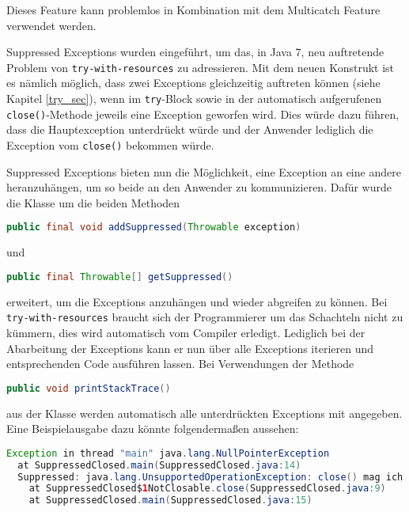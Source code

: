 \documentclass[times, 10pt,twocolumn]{article}
\begin{document}
Dieses Feature kann problemlos in Kombination mit dem Multicatch Feature verwendet werden.

\label{supp_exception_subsec}
Suppressed Exceptions wurden eingeführt, um das, in Java 7, neu auftretende Problem von \texttt{try-with-resources} zu adressieren.
Mit dem neuen Konstrukt ist es nämlich möglich, dass zwei Exceptions gleichzeitig auftreten können (siehe Kapitel \ref{try_sec}), wenn im
\texttt{try}-Block sowie in der automatisch aufgerufenen \texttt{close()}-Methode jeweils eine Exception geworfen wird. Dies würde
dazu führen, dass die Hauptexception unterdrückt würde und der Anwender lediglich die Exception vom \texttt{close()} bekommen würde.

Suppressed Exceptions bieten nun die Möglichkeit, eine Exception an eine andere heranzuhängen, um so beide an den Anwender zu
kommunizieren. Dafür wurde die Klasse  um die beiden Methoden 
\begin{lstlisting}[language=java,breaklines=true]
public final void addSuppressed(Throwable exception)
\end{lstlisting}
und 
\begin{lstlisting}[language=java,breaklines=true]
public final Throwable[] getSuppressed()
\end{lstlisting}
erweitert, um die Exceptions anzuhängen und wieder abgreifen zu können. 
Bei \texttt{try-with-resources} braucht sich der Programmierer um das Schachteln nicht zu kümmern, dies wird 
automatisch vom Compiler erledigt.\cite{sbJ7coin} Lediglich bei der Abarbeitung der Exceptions kann er nun über
alle Exceptions iterieren und entsprechenden Code ausführen lassen. Bei Verwendungen der Methode
\begin{lstlisting}[language=java,breaklines=true]
public void printStackTrace()
\end{lstlisting}
aus der Klasse  werden automatisch alle unterdrückten Exceptions mit angegeben. Eine Beispielausgabe dazu könnte
folgendermaßen aussehen\cite{javainsel2}:
\begin{lstlisting}[language=java,breaklines=true]
Exception in thread "main" java.lang.NullPointerException
  at SuppressedClosed.main(SuppressedClosed.java:14)
  Suppressed: java.lang.UnsupportedOperationException: close() mag ich nicht
    at SuppressedClosed$1NotClosable.close(SuppressedClosed.java:9)
    at SuppressedClosed.main(SuppressedClosed.java:15)
\end{lstlisting}
\end{document}
